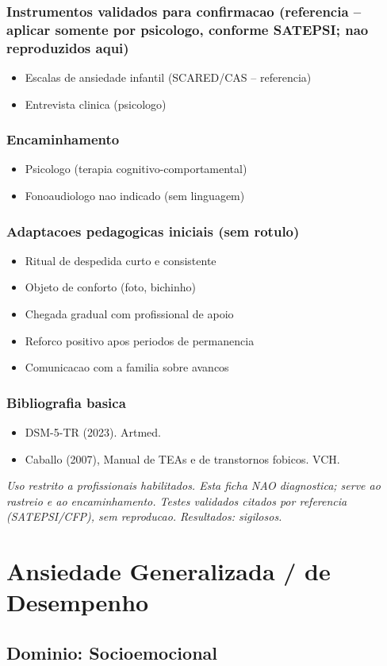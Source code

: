 \documentclass[a4paper,11pt]{book}
\newcommand{\avisolegal}{\par\medskip\noindent\footnotesize\itshape
\color{cinza}Uso restrito a profissionais habilitados. Esta ficha NAO diagnostica;
serve ao rastreio e ao encaminhamento. Testes validados citados por referencia
(SATEPSI/CFP), sem reproducao. Resultados: sigilosos.\color{black}\par}
\begin{document}
\subsection*{Instrumentos validados para confirmacao (referencia -- aplicar somente por psicologo, conforme SATEPSI; nao reproduzidos aqui)}
\begin{itemize}
\item Escalas de ansiedade infantil (SCARED/CAS -- referencia)
\item Entrevista clinica (psicologo)
\end{itemize}
\subsection*{Encaminhamento}
\begin{itemize}
\item Psicologo (terapia cognitivo-comportamental)
\item Fonoaudiologo nao indicado (sem linguagem)
\end{itemize}
\subsection*{Adaptacoes pedagogicas iniciais (sem rotulo)}
\begin{itemize}
\item Ritual de despedida curto e consistente
\item Objeto de conforto (foto, bichinho)
\item Chegada gradual com profissional de apoio
\item Reforco positivo apos periodos de permanencia
\item Comunicacao com a familia sobre avancos
\end{itemize}
\subsection*{Bibliografia basica}
\begin{itemize}
\item DSM-5-TR (2023). Artmed.
\item Caballo (2007), Manual de TEAs e de transtornos fobicos. VCH.
\end{itemize}
\avisolegal


\chapter{Ansiedade Generalizada / de Desempenho}
\section*{Dominio: Socioemocional}
\end{document}
